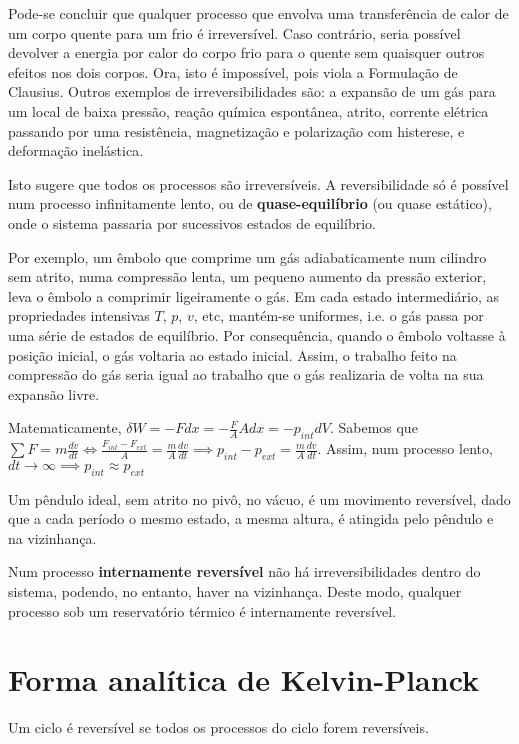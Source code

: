 Pode-se concluir que qualquer processo que envolva uma transferência de calor de um corpo quente para um frio é irreversível. Caso contrário, seria possível devolver a energia por calor do corpo frio para o quente sem quaisquer outros efeitos nos dois corpos. Ora, isto é impossível, pois viola a Formulação de Clausius. Outros exemplos de irreversibilidades são: a expansão de um gás para um local de baixa pressão, reação química espontânea, atrito, corrente elétrica passando por uma resistência, magnetização e polarização com histerese, e deformação inelástica.

Isto sugere que todos os processos são irreversíveis. A reversibilidade só é possível num processo infinitamente lento, ou de \textbf{quase-equilíbrio} (ou quase estático), onde o sistema passaria por sucessivos estados de equilíbrio.

Por exemplo, um êmbolo que comprime um gás adiabaticamente num cilindro sem atrito, numa compressão lenta, um pequeno aumento da pressão exterior, leva o êmbolo a comprimir ligeiramente o gás. Em cada estado intermediário, as propriedades intensivas $T$, $p$, $v$, etc, mantém-se uniformes, i.e. o gás passa por uma série de estados de equilíbrio. Por consequência, quando o êmbolo voltasse à posição inicial, o gás voltaria ao estado inicial. Assim, o trabalho feito na compressão do gás seria igual ao trabalho que o gás realizaria de volta na sua expansão livre. 

Matematicamente, $\delta W = - F dx = -\frac{F}{A} A dx = -p_{int} dV$. Sabemos que $\sum F = m \frac{dv}{dt} \Longleftrightarrow \frac{F_{int} - F_{ext}}{A} = \frac{m}{A}\frac{dv}{dt} \implies p_{int} - p_{ext} = \frac{m}{A} \frac{dv}{dt}$. Assim, num processo lento, $dt \to \infty \implies p_{int} \approx p_{ext}$

Um pêndulo ideal, sem atrito no pivô, no vácuo, é um movimento reversível, dado que a cada período o mesmo estado, a mesma altura, é atingida pelo pêndulo e na vizinhança.

Num processo \textbf{internamente reversível} não há irreversibilidades dentro do sistema, podendo, no entanto, haver na vizinhança. Deste modo, qualquer processo sob um reservatório térmico é internamente reversível.

\section{Forma analítica de Kelvin-Planck}

Um ciclo é reversível se todos os processos do ciclo forem reversíveis.

